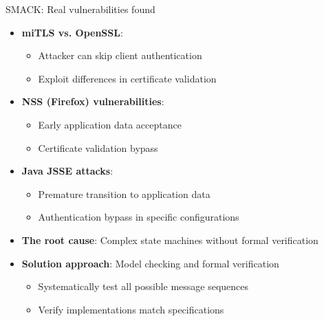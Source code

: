 \documentclass[aspectratio=169, lualatex, handout]{beamer}
\begin{document}
\begin{frame}{SMACK: Real vulnerabilities found}
	\begin{itemize}
		\item \textbf{miTLS vs. OpenSSL}:
		      \begin{itemize}
			      \item Attacker can skip client authentication
			      \item Exploit differences in certificate validation
		      \end{itemize}
		\item \textbf{NSS (Firefox) vulnerabilities}:
		      \begin{itemize}
			      \item Early application data acceptance
			      \item Certificate validation bypass
		      \end{itemize}
		\item \textbf{Java JSSE attacks}:
		      \begin{itemize}
			      \item Premature transition to application data
			      \item Authentication bypass in specific configurations
		      \end{itemize}
		\item \textbf{The root cause}: Complex state machines without formal verification
		\item \textbf{Solution approach}: Model checking and formal verification
		      \begin{itemize}
			      \item Systematically test all possible message sequences
			      \item Verify implementations match specifications
		      \end{itemize}
	\end{itemize}
\end{frame}
\end{document}

